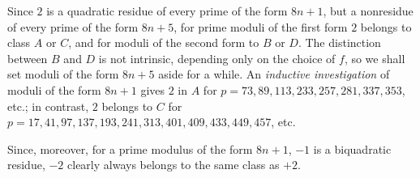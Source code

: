 Since $2$ is a quadratic residue of every prime of the form $8n+1$, but a nonresidue of every prime of the form $8n+5$, for prime moduli of the first form $2$ belongs to class $A$ or $C$, and for moduli of the second form to $B$ or $D$. The distinction between $B$ and $D$ is not intrinsic, depending only on the choice of $f$, so we shall set moduli of the form $8n+5$ aside for a while. An \emph{inductive investigation} of moduli of the form $8n+1$ gives $2$ in $A$ for $p=73,89,113,233,257,281,337,353$, etc.; in contrast, $2$ belongs to $C$ for $p=17,41,97,137,193,241,313,401,409,433,449,457$, etc.

Since, moreover, for a prime modulus of the form $8n+1$, $-1$ is a biquadratic residue, $-2$ clearly always belongs to the same class as $+2$.
